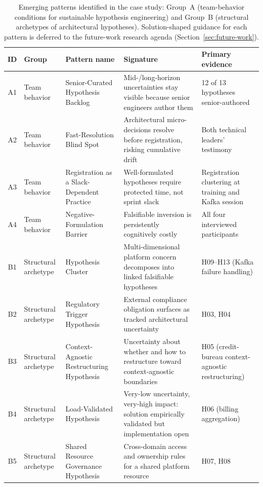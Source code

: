 \begin{table}[htbp]
\caption{Emerging patterns identified in the case study: Group~A (team-behavior
conditions for sustainable hypothesis engineering) and Group~B (structural
archetypes of architectural hypotheses). Solution-shaped guidance for each
pattern is deferred to the future-work research agenda
(Section~\ref{sec:future-work}).}
\label{tab:emerging-patterns}
\centering\small
\setlength{\tabcolsep}{4pt}
\begin{tabular}{clp{3.6cm}p{5.2cm}p{2.6cm}}
\toprule
\textbf{ID} & \textbf{Group} & \textbf{Pattern name} & \textbf{Signature} &
\textbf{Primary evidence} \\
\midrule
A1 & Team behavior & Senior-Curated Hypothesis Backlog
   & Mid-/long-horizon uncertainties stay visible because senior engineers
     author them
   & 12 of 13 hypotheses senior-authored \\
A2 & Team behavior & Fast-Resolution Blind Spot
   & Architectural micro-decisions resolve before registration, risking
     cumulative drift
   & Both technical leaders' testimony \\
A3 & Team behavior & Registration as a Slack-Dependent Practice
   & Well-formulated hypotheses require protected time, not sprint slack
   & Registration clustering at training and Kafka session \\
A4 & Team behavior & Negative-Formulation Barrier
   & Falsifiable inversion is persistently cognitively costly
   & All four interviewed participants \\
\midrule
B1 & Structural archetype & Hypothesis Cluster
   & Multi-dimensional platform concern decomposes into linked falsifiable
     hypotheses
   & H09--H13 (Kafka failure handling) \\
B2 & Structural archetype & Regulatory Trigger Hypothesis
   & External compliance obligation surfaces as tracked architectural
     uncertainty
   & H03, H04 \\
B3 & Structural archetype & Context-Agnostic Restructuring Hypothesis
   & Uncertainty about whether and how to restructure toward context-agnostic boundaries
   & H05 (credit-bureau context-agnostic restructuring) \\
B4 & Structural archetype & Load-Validated Hypothesis
   & Very-low uncertainty, very-high impact: solution empirically validated
     but implementation open
   & H06 (billing aggregation) \\
B5 & Structural archetype & Shared Resource Governance Hypothesis
   & Cross-domain access and ownership rules for a shared platform resource
   & H07, H08 \\
\bottomrule
\end{tabular}
\end{table}

